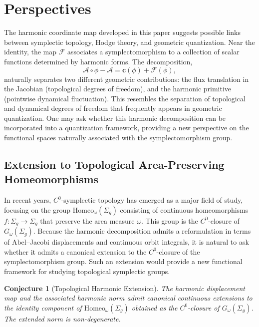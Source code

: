 \documentclass[11pt]{article}
\newtheorem{conjecture}[theorem]{Conjecture}
\theoremstyle{definition}
\begin{document}
	
	\section*{Perspectives}
	
	The harmonic coordinate map developed in this paper suggests possible links
	between symplectic topology, Hodge theory, and geometric quantization. Near the
	identity, the map $\mathcal F$ associates a symplectomorphism to a collection
	of scalar functions determined by harmonic forms. The decomposition, 
	\[
	\mathcal A\circ\phi-\mathcal A = \mathbf c(\phi)+\mathcal F(\phi),
	\]
	naturally separates two different geometric contributions: the flux translation
	in the Jacobian (topological degrees of freedom), and the harmonic primitive
	(pointwise dynamical fluctuation). This resembles the separation of topological
	and dynamical degrees of freedom that frequently appears in geometric
	quantization. One may ask whether this harmonic decomposition can be
	incorporated into a quantization framework, providing a new perspective on the
	functional spaces naturally associated with the symplectomorphism group.
	
	\subsection*{Extension to Topological Area-Preserving Homeomorphisms}
	
	In recent years, $C^0$-symplectic topology has emerged as a major field of
	study, focusing on the group $\mathrm{Homeo}_\omega(\Sigma_g)$ consisting of
	continuous homeomorphisms $f: \Sigma_g \to \Sigma_g$ that preserve the area
	measure $\omega$. This group is the $C^0$-closure of $G_\omega(\Sigma_g)$. 	Because the harmonic decomposition admits a reformulation in terms of
	Abel--Jacobi displacements and continuous orbit integrals, it is natural to ask
	whether it admits a canonical extension to the $C^0$-closure of the
	symplectomorphism group. Such an extension would provide a new functional
	framework for studying topological symplectic groups.
	
	\begin{conjecture}[Topological Harmonic Extension]
		The harmonic displacement map and the associated harmonic norm admit canonical
		continuous extensions to the identity component of $\mathrm{Homeo}_\omega(\Sigma_g)$
		obtained as the $C^0$-closure of $G_\omega(\Sigma_g)$. The extended norm is
		non-degenerate.
	\end{conjecture}
	
\end{document}

